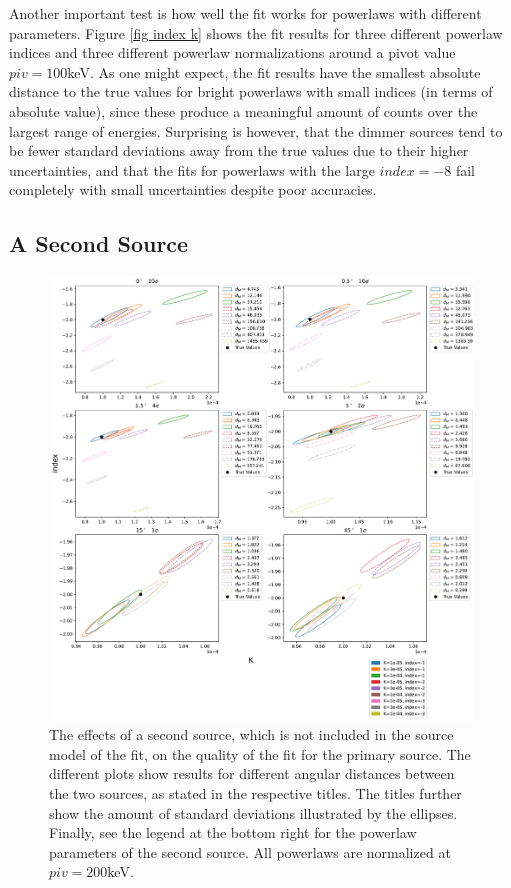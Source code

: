 \documentclass{article}
\begin{document}
Another important test is how well the fit works for powerlaws with different parameters. Figure \ref{fig index k} shows the fit results for three different powerlaw indices and three different powerlaw normalizations around a pivot value $piv=100$keV. As one might expect, the fit results have the smallest absolute distance to the true values for bright powerlaws with small indices (in terms of absolute value), since these produce a meaningful amount of counts over the largest range of energies. Surprising is however, that the dimmer sources tend to be fewer standard deviations away from the true values due to their higher uncertainties, and that the fits for powerlaws with the large $index=-8$ fail completely with small uncertainties despite poor accuracies.


\subsection{A Second Source}

\begin{figure}[h]
    \centering
    \includegraphics[width=\textwidth]{Images/sec_source.pdf}
    \caption{The effects of a second source, which is not included in the source model of the fit, on the quality of the fit for the primary source. The different plots show results for different angular distances between the two sources, as stated in the respective titles. The titles further show the amount of standard deviations illustrated by the ellipses. Finally, see the legend at the bottom right for the powerlaw parameters of the second source. All powerlaws are normalized at $piv=200$keV.}
    \label{fig sec source}
\end{figure}
\end{document}
